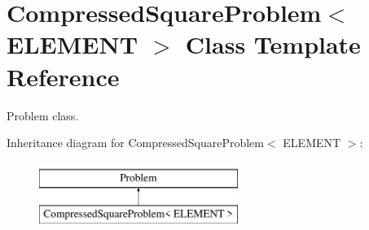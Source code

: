 \hypertarget{classCompressedSquareProblem}{}\section{Compressed\+Square\+Problem$<$ E\+L\+E\+M\+E\+NT $>$ Class Template Reference}
\label{classCompressedSquareProblem}


Problem class.  


Inheritance diagram for Compressed\+Square\+Problem$<$ E\+L\+E\+M\+E\+NT $>$\+:\begin{figure}[H]
\begin{center}
\leavevmode
\includegraphics[height=2.000000cm]{classCompressedSquareProblem}
\end{center}
\end{figure}
